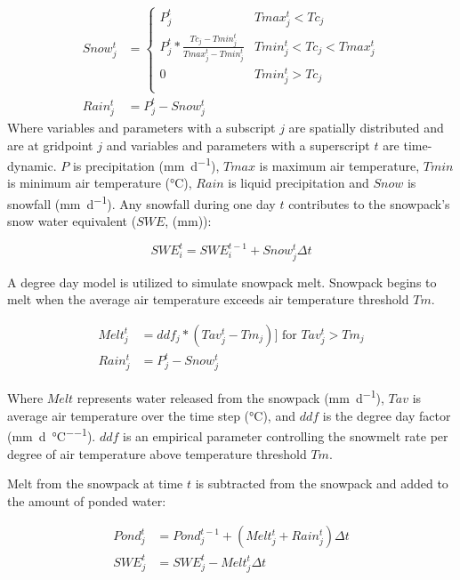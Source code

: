 \begin{align}
Snow_j^t &= \left\{
        \begin{array}{ll}
        P_j^t &  Tmax_j^t < Tc_j \\  
        P_j^t * \frac{Tc_j - Tmin_j^t}{Tmax_j^t - Tmin_j^t} & Tmin_j^t < Tc_j < Tmax_j^t \\
        0 &  Tmin_j^t > Tc_j \\
        \end{array}
\right.\\
Rain_j^t &= P_j^t - Snow_j^t     
\end{align}
\noindent Where variables and parameters with a subscript $j$ are spatially distributed and are at gridpoint $j$ and variables and parameters with a superscript $t$ are time-dynamic. $P$ is precipitation (\si{\milli\metre\per\day}), $Tmax$ is maximum air temperature, $Tmin$ is minimum air temperature (\si{\degreeCelsius}), $Rain$ is liquid precipitation and $Snow$ is snowfall (\si{\milli\metre\per\day}). Any  snowfall during one day $t$ contributes to the snowpack's snow water equivalent ($SWE$, (\si{\milli\metre})):

\begin{equation}
SWE_i^t = SWE_i^{t-1} + Snow_j^t \Delta t
\end{equation}

A degree day model is utilized to simulate snowpack melt. Snowpack begins to melt when the average air temperature exceeds air temperature threshold $Tm$.

\begin{align}
Melt_j^t &= ddf_j * (Tav_j^t - Tm_j)  ]\text{ for } Tav_j^t > Tm_j \\
Rain_j^t &= P_j^t - Snow_j^t     
\end{align}

\noindent Where $Melt$ represents water released from the snowpack (\si{\milli\metre\per\day}), $Tav$ is average air temperature over the time step (\si{\degreeCelsius}), and $ddf$ is the degree day factor (\si{\milli\metre\per\day\per\degreeCelsius}). $ddf$ is an empirical parameter controlling the snowmelt rate per degree of air temperature above temperature threshold $Tm$. 

Melt from the snowpack at time $t$ is subtracted from the snowpack and added to the amount of ponded water:

\begin{align}
Pond_j^t &= Pond_j^{t-1} + (Melt_j^t + Rain_j^t)\Delta t \\
SWE_j^t &= SWE_j^t - Melt_j^t \Delta t   
\end{align}

